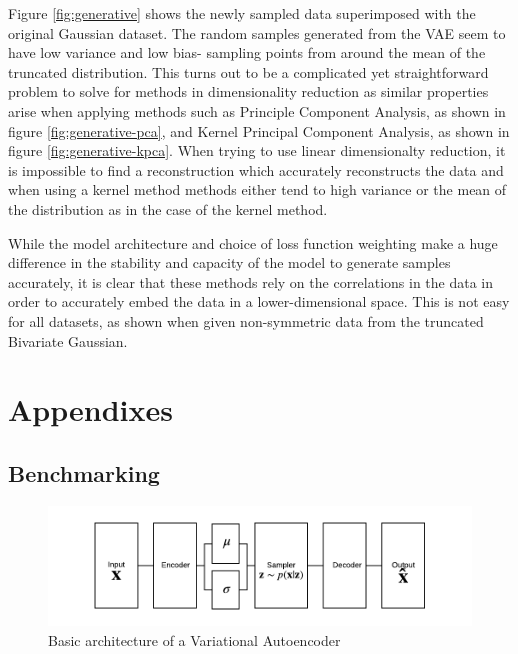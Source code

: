 \documentclass[12pt]{article}
\begin{document}
Figure \ref{fig:generative} shows the newly sampled data superimposed with the original Gaussian dataset. The random samples generated from the VAE seem to have low variance and low bias- sampling points from around the mean of the truncated distribution.  This turns out to be a complicated yet straightforward problem to solve for methods in dimensionality reduction as similar properties arise when applying methods such as Principle Component Analysis, as shown in figure \ref{fig:generative-pca}, and Kernel Principal Component Analysis, as shown in figure \ref{fig:generative-kpca}. When trying to use linear dimensionalty reduction, it is impossible to find a reconstruction which accurately reconstructs the data and when using a kernel method methods either tend to high variance or the mean of the distribution as in the case of the kernel method.  
  
While the model architecture and choice of loss function weighting make a huge difference in the stability and capacity of the model to generate samples accurately, it is clear that these methods rely on the correlations in the data in order to accurately embed the data in a lower-dimensional space. This is not easy for all datasets, as shown when given non-symmetric data from the truncated Bivariate Gaussian.  


\section{Appendixes}
\subsection{Benchmarking}

\begin{figure}[h]
\includegraphics[width=1\textwidth]{../../media/encoder.png}%
\caption{Basic architecture of a Variational Autoencoder}
\label{fig:Bench1}
\end{figure}
\end{document}
